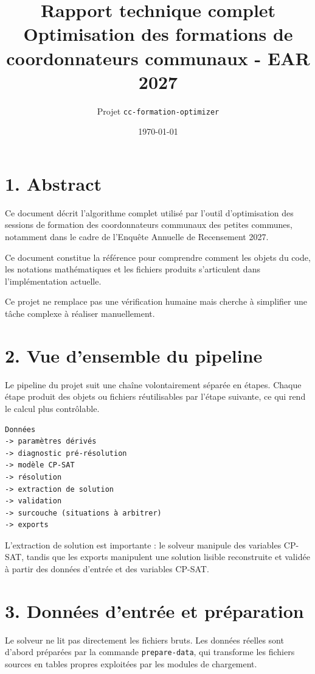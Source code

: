 \documentclass[11pt,a4paper]{article}
\title{\textbf{Rapport technique complet}\\
\large Optimisation des formations de coordonnateurs communaux - EAR 2027}
\author{Projet \texttt{cc-formation-optimizer}}
\date{\today}
\begin{document}
\maketitle
\tableofcontents
\newpage

\section{1. Abstract}

Ce document décrit l'algorithme complet utilisé par l'outil d'optimisation des sessions de formation des coordonnateurs communaux des petites communes, notamment dans le cadre de l'Enquête Annuelle de Recensement 2027. 

Ce document constitue la référence pour comprendre comment les objets du code, les notations mathématiques et les fichiers produits s'articulent dans l'implémentation actuelle.

Ce projet ne remplace pas une vérification humaine mais cherche à simplifier une tâche complexe à réaliser manuellement.

\section{2. Vue d'ensemble du pipeline}

Le pipeline du projet suit une chaîne volontairement séparée en étapes. Chaque étape produit des objets ou fichiers réutilisables par l'étape suivante, ce qui rend le calcul plus contrôlable.

\begin{verbatim}
Données 
-> paramètres dérivés
-> diagnostic pré-résolution
-> modèle CP-SAT
-> résolution
-> extraction de solution
-> validation 
-> surcouche (situations à arbitrer)
-> exports

\end{verbatim}


L'extraction de solution est importante : le solveur manipule des variables CP-SAT, tandis que les exports manipulent une solution lisible reconstruite et validée à partir des données d'entrée et des variables CP-SAT. 

\newpage
\section{3. Données d'entrée et préparation}

Le solveur ne lit pas directement les fichiers bruts. Les données réelles sont d'abord préparées par la commande \texttt{prepare-data}, qui transforme les fichiers sources en tables propres exploitées par les modules de chargement.
\end{document}
